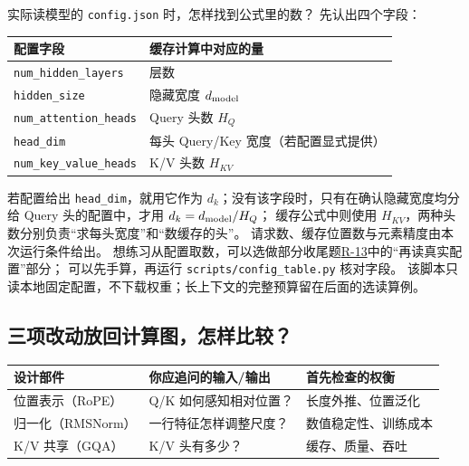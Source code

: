 

实际读模型的 \texttt{config.json} 时，怎样找到公式里的数？
先认出四个字段：
\begin{center}\small
{}
\begin{tabular}{@{}ll@{}}\toprule
配置字段 & 缓存计算中对应的量\\\midrule
\texttt{num\_hidden\_layers} & 层数\\
\texttt{hidden\_size} & 隐藏宽度 $d_{\rm model}$\\
\texttt{num\_attention\_heads} & Query 头数 $H_Q$\\
\texttt{head\_dim} & 每头 Query/Key 宽度（若配置显式提供）\\
\texttt{num\_key\_value\_heads} & K/V 头数 $H_{KV}$\\\bottomrule
\end{tabular}
\end{center}
若配置给出 \texttt{head\_dim}，就用它作为 $d_k$；没有该字段时，只有在确认隐藏宽度均分给 Query 头的配置中，才用 $d_k=d_{\rm model}/H_Q$；
缓存公式中则使用 $H_{KV}$，两种头数分别负责“求每头宽度”和“数缓存的头”。
请求数、缓存位置数与元素精度由本次运行条件给出。
想练习从配置取数，可以选做部分收尾题\hyperref[exercise:R-13]{R-13}中的“再读真实配置”部分；
可以先手算，再运行 \texttt{scripts/config\_table.py} 核对字段。
该脚本只读本地固定配置，不下载权重；长上下文的完整预算留在后面的选读算例。

\subsection{三项改动放回计算图，怎样比较？}
\label{sec:modern-core-comparison}

\begin{center}
\small
\renewcommand{\arraystretch}{1.3}
\begin{tabularx}{\linewidth}{@{}>{\raggedright\arraybackslash}p{30mm}>{\raggedright\arraybackslash}p{45mm}>{\raggedright\arraybackslash}X@{}}
\toprule
设计部件 & 你应追问的输入/输出 & 首先检查的权衡\\
\midrule
位置表示（RoPE） & Q/K 如何感知相对位置？ & 长度外推、位置泛化\\
归一化（RMSNorm） & 一行特征怎样调整尺度？ & 数值稳定性、训练成本\\
K/V 共享（GQA） & K/V 头有多少？ & 缓存、质量、吞吐\\
\bottomrule
\end{tabularx}
\end{center}

